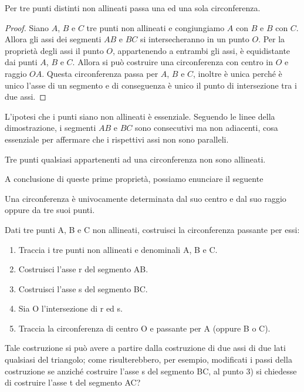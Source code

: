 \begin{teorema}
Per tre punti distinti non allineati passa una ed una sola 
circonferenza.
\end{teorema}

\noindent\begin{minipage}{0.65\textwidth}\parindent15pt
\begin{proof}
Siano $A$, $B$ e $C$ tre punti non allineati e congiungiamo $A$ con 
$B$ e $B$ con $C$. Allora gli assi dei segmenti $AB$ e $BC$ si 
intersecheranno in un punto $O$. Per la proprietà degli assi il punto 
$O$, appartenendo a entrambi gli assi, è equidistante dai punti $A$, 
$B$ e $C$. Allora si può costruire una circonferenza con centro in 
$O$ e raggio $OA$. Questa circonferenza passa per $A$, $B$ e $C$, 
inoltre è unica perché è unico l'asse di un segmento e di conseguenza 
è unico il punto di intersezione tra i due assi.
\end{proof}
\end{minipage}\hfil
\begin{minipage}{0.35\textwidth}
  \centering
\end{minipage}

\osservazione
L'ipotesi che i punti siano non allineati è essenziale. Seguendo le 
linee della dimostrazione, i segmenti $AB$ e $BC$ sono consecutivi ma 
non adiacenti, cosa essenziale per affermare che i rispettivi assi 
non sono paralleli. 

\begin{corollario}
Tre punti qualsiasi appartenenti ad una circonferenza non sono 
allineati.
\end{corollario}

A conclusione di queste prime proprietà, possiamo enunciare il 
seguente
\begin{corollario}
Una circonferenza è univocamente determinata dal suo centro e dal suo 
raggio oppure da tre suoi punti.
\end{corollario}

\begin{procedura}
  Dati tre punti A, B e C non allineati, costruisci la circonferenza 
passante per essi:
  \begin{enumerate} [nosep]
    \item 
    Traccia i tre punti non allineati e denominali A, B e C.
    \item 
    Costruisci l'asse r del segmento AB. 
    \item 
    Costruisci l'asse s del segmento BC. 
    \item 
    Sia O l'intersezione di r ed s.
    \item 
    Traccia la circonferenza di centro O e passante per A (oppure B 
o C).
  \end{enumerate}
  Tale costruzione si può avere a partire dalla costruzione di due assi 
di due lati qualsiasi del triangolo; come risulterebbero, per esempio, 
modificati i passi della costruzione se anziché costruire l'asse s del segmento 
BC, al punto 3) si chiedesse di costruire l'asse t del segmento AC?
\end{procedura} 

